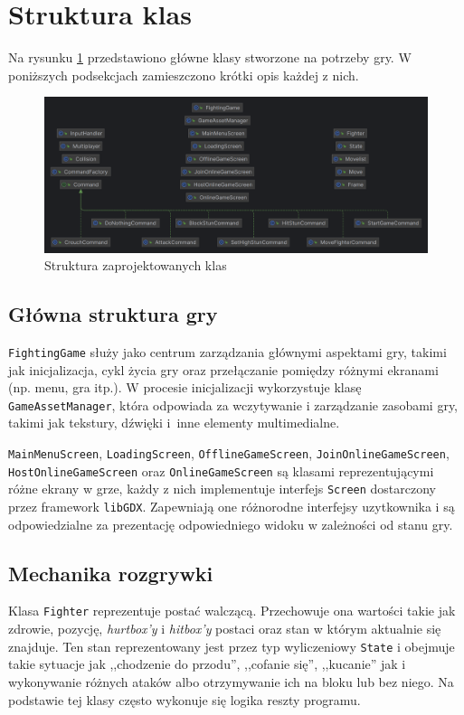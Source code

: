 \section{Struktura klas}
Na rysunku \ref{fig:struktura_klas} przedstawiono główne klasy stworzone na potrzeby gry. W poniższych podsekcjach zamieszczono krótki opis każdej z nich.
\begin{figure}[htb]
	\centering
		\includegraphics[width=1\linewidth]{rys03/struktura_klas}
	\caption{Struktura zaprojektowanych klas}
	\label{fig:struktura_klas}
\end{figure}

\subsection{Główna struktura gry}
\texttt{FightingGame} służy jako centrum zarządzania głównymi aspektami gry, takimi jak inicjalizacja, cykl życia gry oraz przełączanie pomiędzy różnymi ekranami (np. menu, gra itp.). W procesie inicjalizacji wykorzystuje klasę \texttt{GameAssetManager}, która odpowiada za wczytywanie i zarządzanie zasobami gry, takimi jak tekstury, dźwięki i~inne elementy multimedialne.

\texttt{MainMenuScreen}, \texttt{LoadingScreen}, \texttt{OfflineGameScreen}, \texttt{JoinOnlineGameScreen}, \texttt{HostOnlineGameScreen} oraz \texttt{OnlineGameScreen} są klasami reprezentującymi różne ekrany w grze, każdy z nich implementuje interfejs \texttt{Screen} dostarczony przez framework \texttt{libGDX}. Zapewniają one różnorodne interfejsy uzytkownika i są odpowiedzialne za prezentację odpowiedniego widoku w zależności od stanu gry.

\subsection{Mechanika rozgrywki}
Klasa \texttt{Fighter} reprezentuje postać walczącą. Przechowuje ona wartości takie jak zdrowie, pozycję, \emph{hurtbox'y} i \emph{hitbox'y} postaci oraz stan w którym aktualnie się znajduje. Ten stan reprezentowany jest przez typ wyliczeniowy \texttt{State} i obejmuje takie sytuacje jak ,,chodzenie do przodu'', ,,cofanie się'', ,,kucanie'' jak i wykonywanie różnych ataków albo otrzymywanie ich na bloku lub bez niego. Na podstawie tej klasy często wykonuje się logika reszty programu. 

